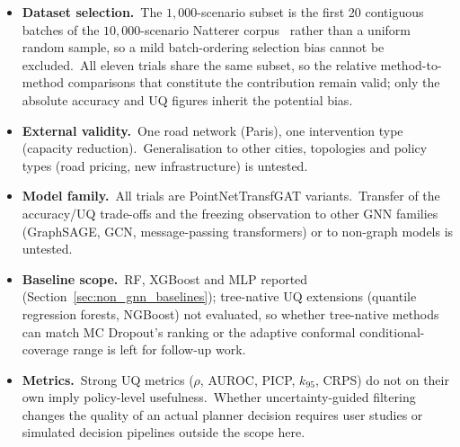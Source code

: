 \begin{itemize}
\item \textbf{Dataset selection.}\ The $1{,}000$-scenario subset is the first 20 contiguous batches of the $10{,}000$-scenario Natterer corpus~\cite{natterer2025ml} rather than a uniform random sample, so a mild batch-ordering selection bias cannot be excluded.\ All eleven trials share the same subset, so the relative method-to-method comparisons that constitute the contribution remain valid; only the absolute accuracy and UQ figures inherit the potential bias.
\item \textbf{External validity.}\ One road network (Paris), one intervention type (capacity reduction).\ Generalisation to other cities, topologies and policy types (road pricing, new infrastructure) is untested.
\item \textbf{Model family.}\ All trials are PointNetTransfGAT variants.\ Transfer of the accuracy/UQ trade-offs and the freezing observation to other GNN families (GraphSAGE, GCN, message-passing transformers) or to non-graph models is untested.
\item \textbf{Baseline scope.}\ RF, XGBoost and MLP reported (Section~\ref{sec:non_gnn_baselines}); tree-native UQ extensions (quantile regression forests, NGBoost) not evaluated, so whether tree-native methods can match MC Dropout's ranking or the adaptive conformal conditional-coverage range is left for follow-up work.
\item \textbf{Metrics.}\ Strong UQ metrics ($\rho$, AUROC, PICP, $k_{95}$, CRPS) do not on their own imply policy-level usefulness.\ Whether uncertainty-guided filtering changes the quality of an actual planner decision requires user studies or simulated decision pipelines outside the scope here.
\end{itemize}
